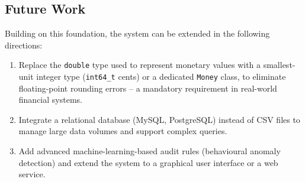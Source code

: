 \documentclass[12pt, oneside]{report}
\begin{document}
\subsection*{Future Work}
Building on this foundation, the system can be extended in the following directions:
\begin{enumerate}
    \item Replace the \texttt{double} type used to represent monetary values with a smallest-unit integer type (\texttt{int64\_t} cents) or a dedicated \texttt{Money} class, to eliminate floating-point rounding errors -- a mandatory requirement in real-world financial systems.
    \item Integrate a relational database (MySQL, PostgreSQL) instead of CSV files to manage large data volumes and support complex queries.
    \item Add advanced machine-learning-based audit rules (behavioural anomaly detection) and extend the system to a graphical user interface or a web service.
\end{enumerate}


\renewcommand{\bibname}{References}

\end{document}
